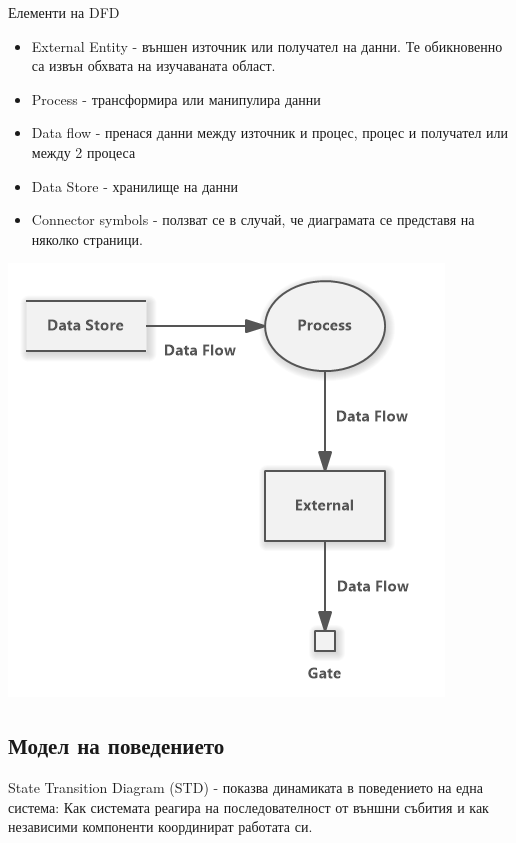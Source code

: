 \documentclass[fleqn,12pt]{article}
\begin{document}
\begin{multicols}{2}

Елементи на DFD
\begin{itemize}
	\item External Entity - външен източник или получател на данни. Те обикновенно са извън обхвата на изучаваната област.
	\item Process - трансформира или манипулира данни
	\item Data flow - пренася данни между източник и процес, процес и получател или между 2 процеса
	\item Data Store - хранилище на данни
	\item Connector symbols - ползват се в случай, че диаграмата се представя на няколко страници.
\end{itemize}

\includegraphics[scale=0.6]{data-flow-diagram}

\end{multicols}

\pagebreak
\subsection{Модел  на  поведението}
State Transition Diagram (STD) - показва динамиката в поведението на една система: Как системата реагира на последователност от външни събития и как независими компоненти координират работата си.
\end{document}
